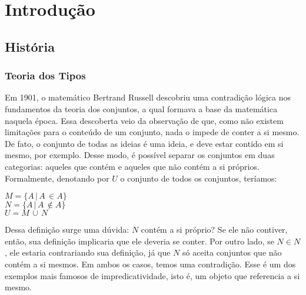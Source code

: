 \documentclass[12pt, oneside, a4paper,english,brazil]{abntex2}
\begin{document}
\imprimircapa
\imprimirfolhaderosto

\tableofcontents* %

\glsaddall
\printglossaries

\textual

\chapter{Introdução}
\section{Hist\'oria}

\subsection*{Teoria dos Tipos}

\qquad Em 1901, o matemático Bertrand Russell descobriu uma contradição lógica nos
fundamentos da teoria dos conjuntos, a qual formava a base da matemática naquela época.
Essa descoberta veio da observação de que, como não existem limitações para o conteúdo
de um conjunto, nada o impede de conter a si mesmo. De fato, o conjunto de todas as
ideias é uma ideia, e deve estar contido em si mesmo, por exemplo. Desse modo, é possível
separar os conjuntos em duas categorias: aqueles que contém e aqueles que não contém a
si próprios. Formalmente, denotando por $U$ o conjunto de todos os conjuntos, teríamos:

\begin{center}
  $M = \{A\, |\, A\, \in A\}$ \\
  $N = \{A\, |\, A\, \notin A\}$ \\
  $U = M\, \cup\, N$
\end{center}

\qquad Dessa definição surge uma dúvida: $N$ contém a si próprio? Se ele não contiver,
então, sua definição implicaria que ele deveria se conter. Por outro lado, se $N \in N$, ele
estaria contrariando sua definição, já que $N$ só aceita conjuntos que não contém a si
mesmos. Em ambos os casos, temos uma contradição. Esse é um dos exemplos mais
famosos de impredicatividade, isto é, um objeto que referencia a si mesmo.
\end{document}
